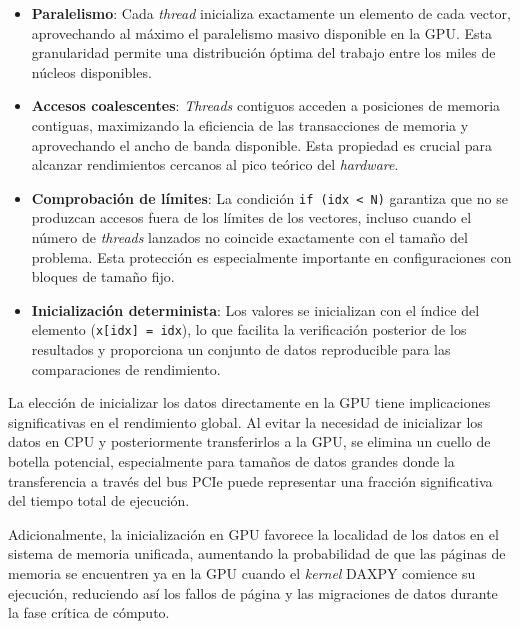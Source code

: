         \begin{itemize}
        
            \item \textbf{Paralelismo}: Cada \textit{thread} inicializa exactamente un elemento de cada vector, aprovechando al máximo el paralelismo masivo disponible en la GPU. Esta granularidad permite una distribución óptima del trabajo entre los miles de núcleos disponibles.
            
            \item \textbf{Accesos coalescentes}: \textit{Threads} contiguos acceden a posiciones de memoria contiguas, maximizando la eficiencia de las transacciones de memoria y aprovechando el ancho de banda disponible. Esta propiedad es crucial para alcanzar rendimientos cercanos al pico teórico del \textit{hardware}.
            
            \item \textbf{Comprobación de límites}: La condición \texttt{if (idx < N)} garantiza que no se produzcan accesos fuera de los límites de los vectores, incluso cuando el número de \textit{threads} lanzados no coincide exactamente con el tamaño del problema. Esta protección es especialmente importante en configuraciones con bloques de tamaño fijo.
            
            \item \textbf{Inicialización determinista}: Los valores se inicializan con el índice del elemento (\texttt{x[idx] = idx}), lo que facilita la verificación posterior de los resultados y proporciona un conjunto de datos reproducible para las comparaciones de rendimiento.
            
        \end{itemize}

        La elección de inicializar los datos directamente en la GPU tiene implicaciones significativas en el rendimiento global. Al evitar la necesidad de inicializar los datos en CPU y posteriormente transferirlos a la GPU, se elimina un cuello de botella potencial, especialmente para tamaños de datos grandes donde la transferencia a través del bus PCIe puede representar una fracción significativa del tiempo total de ejecución.
        
        Adicionalmente, la inicialización en GPU favorece la localidad de los datos en el sistema de memoria unificada, aumentando la probabilidad de que las páginas de memoria se encuentren ya en la GPU cuando el \textit{kernel} DAXPY comience su ejecución, reduciendo así los fallos de página y las migraciones de datos durante la fase crítica de cómputo.

